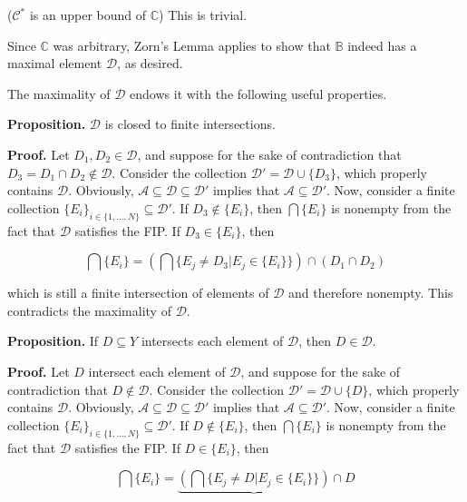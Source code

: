 \documentclass[12pt]{article}
\begin{document}
($\mathcal{C}^*$ is an upper bound of $\mathbb{C}$) This is trivial.

Since $\mathbb{C}$ was arbitrary, Zorn's Lemma applies to show that $\mathbb{B}$ indeed has a maximal element $\mathcal{D}$, as desired.

\vspace{1 \baselineskip}

The maximality of $\mathcal{D}$ endows it with the following useful properties.

\textbf{Proposition. } $\mathcal{D}$ is closed to finite intersections.

\textbf{Proof. } Let $D_1, D_2 \in \mathcal{D}$, and suppose for the sake of contradiction that $D_3 = D_1 \cap D_2 \notin \mathcal{D}$. Consider the collection $\mathcal{D}' = \mathcal{D} \cup \{ D_3 \}$, which properly contains $\mathcal{D}$. Obviously, $\mathcal{A} \subseteq \mathcal{D} \subseteq \mathcal{D}'$ implies that $\mathcal{A} \subseteq \mathcal{D}'$. Now, consider a finite collection $\{ E_i \}_{i \in \{ 1, \dots, N \}} \subseteq \mathcal{D}'$. If $D_3 \notin \{ E_i \}$, then $\bigcap \{ E_i \}$ is nonempty from the fact that $\mathcal{D}$ satisfies the FIP. If $D_3 \in \{ E_i \}$, then

$$\bigcap \{ E_i \} = \left( \bigcap \{ E_j \ne D_3 | E_j \in \{ E_i \} \} \right) \cap (D_1 \cap D_2)$$

which is still a finite intersection of elements of $\mathcal{D}$ and therefore nonempty. This contradicts the maximality of $\mathcal{D}$.

\vspace{1 \baselineskip}

\textbf{Proposition. } If $D \subseteq Y$ intersects each element of $\mathcal{D}$, then $D \in \mathcal{D}$.

\textbf{Proof. } Let $D$ intersect each element of $\mathcal{D}$, and suppose for the sake of contradiction that $D \notin \mathcal{D}$. Consider the collection $\mathcal{D}' = \mathcal{D} \cup \{ D \}$, which properly contains $\mathcal{D}$. Obviously, $\mathcal{A} \subseteq \mathcal{D} \subseteq \mathcal{D}'$ implies that $\mathcal{A} \subseteq \mathcal{D}'$. Now, consider a finite collection $\{ E_i \}_{i \in \{ 1, \dots, N \}} \subseteq \mathcal{D}'$. If $D \notin \{ E_i \}$, then $\bigcap \{ E_i \}$ is nonempty from the fact that $\mathcal{D}$ satisfies the FIP. If $D \in \{ E_i \}$, then

$$\bigcap \{ E_i \} = \underbrace{\left( \bigcap \{ E_j \ne D | E_j \in \{ E_i \} \} \right)} \cap D$$
\end{document}
